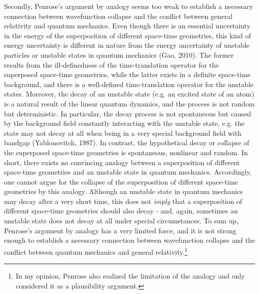 Secondly, Penrose's argument by analogy seems too weak to establish a necessary connection between wavefunction collapse and the conflict between general relativity and quantum mechanics. Even though there is an essential uncertainty in the energy of the superposition of different space-time geometries, this kind of energy uncertainty is different in nature from the energy uncertainty of unstable particles or unstable states in quantum mechanics (Gao, 2010). The former results from the ill-definedness of the time-translation operator for the superposed space-time geometries, while the latter exists in a definite space-time background, and there is a well-defined time-translation operator for the unstable states. Moreover, the decay of an unstable state (e.g. an excited state of an atom) is a natural result of the linear quantum dynamics, and the process is not random but deterministic. In particular, the decay process is not spontaneous but caused by the background field constantly interacting with the unstable state, e.g. the state may not decay at all when being in a very special background field with bandgap (Yablonovitch, 1987). In contrast, the hypothetical decay or collapse of the superposed space-time geometries is spontaneous, nonlinear and random. In short, there exists no convincing analogy between a superposition of different space-time geometries and an unstable state in quantum mechanics. Accordingly, one cannot argue for the collapse of the superposition of different space-time geometries by this analogy. Although an unstable state in quantum mechanics may decay after a very short time, this does not \emph{imply} that a superposition of different space-time geometries should also decay - and, again, sometimes an unstable state does not decay at all under special circumstances. To sum up, Penrose's argument by analogy has a very limited force, and it is not strong enough to establish a necessary connection between wavefunction collapse and the conflict between quantum mechanics and general relativity.\footnote{In my opinion, Penrose also realized the limitation of the analogy and only considered it as a plausibility argument.}


